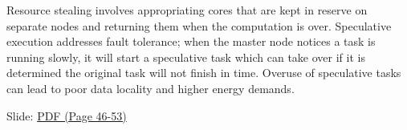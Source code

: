 Resource stealing involves appropriating cores that are kept in reserve
on separate nodes and returning them when the computation is over.
Speculative execution addresses fault tolerance; when the master node
notices a task is running slowly, it will start a speculative task which
can take over if it is determined the original task will not finish in
time. Overuse of speculative tasks can lead to poor data locality and
higher energy demands.


  Slide:
  \href{https://drive.google.com/open?id=0B88HKpainTSfT28zLTdKYWhGdGM}{PDF
  (Page 46-53)}

